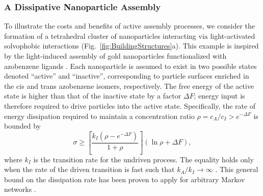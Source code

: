 \begin{appendices}
\subsubsection{A Dissipative Nanoparticle Assembly}

To illustrate the costs and benefits of active assembly processes, we consider the formation of a tetrahedral cluster of nanoparticles interacting via light-activated solvophobic interactions (Fig.~\ref{fig:BuildingStructures}a). This example is inspired by the light-induced assembly of gold nanoparticles functionalized with azobenzene ligands \cite{klajn2007light}.  Each nanoparticle is assumed to exist in two possible states denoted ``active'' and ``inactive'', corresponding to particle surfaces enriched in the cis and trans azobenzene isomers, respectively.  The free energy of the active state is higher than that of the inactive state by a factor $\Delta F$; energy input is therefore required to drive particles into the active state.  Specifically, the rate of energy dissipation required to maintain a concentration ratio $\rho=c_A/c_I> e^{-\Delta F}$ is bounded by 
\begin{equation}
    \sigma \geq \left[\frac{ k_I (\rho - e^{-\Delta F})}{1+\rho}\right] (\ln\rho+\Delta F),
\end{equation}
where $k_I$ is the transition rate for the undriven process. The equality holds only when the rate of the driven transition is fast such that $k_A/k_I\rightarrow \infty$ \cite{Horowitz2017}. This general bound on the dissipation rate has been proven to apply for arbitrary Markov networks \cite{Horowitz2017}.


\end{appendices}
